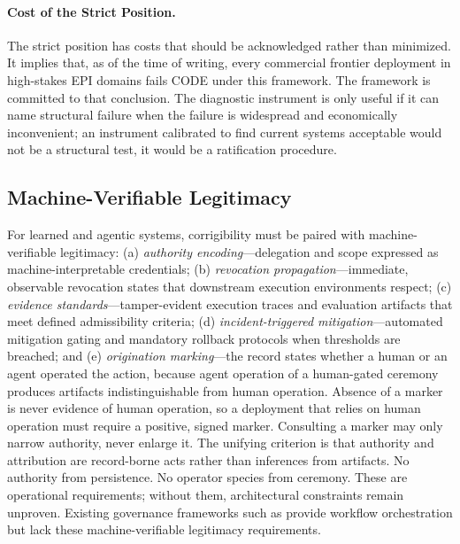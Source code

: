 \documentclass{article}
\theoremstyle{definition}
\begin{document}
\paragraph{Cost of the Strict Position.} The strict position has costs that should be acknowledged rather than minimized. It implies that, as of the time of writing, every commercial frontier deployment in high-stakes EPI domains fails CODE under this framework. The framework is committed to that conclusion. The diagnostic instrument is only useful if it can name structural failure when the failure is widespread and economically inconvenient; an instrument calibrated to find current systems acceptable would not be a structural test, it would be a ratification procedure.

\subsection{Machine-Verifiable Legitimacy}
\label{subsec:machine-verifiable}

For learned and agentic systems, corrigibility must be paired with machine-verifiable legitimacy: (a) \textit{authority encoding}---delegation and scope expressed as machine-interpretable credentials; (b) \textit{revocation propagation}---immediate, observable revocation states that downstream execution environments respect; (c) \textit{evidence standards}---tamper-evident execution traces and evaluation artifacts that meet defined admissibility criteria; (d) \textit{incident-triggered mitigation}---automated mitigation gating and mandatory rollback protocols when thresholds are breached; and (e) \textit{origination marking}---the record states whether a human or an agent operated the action, because agent operation of a human-gated ceremony produces artifacts indistinguishable from human operation. Absence of a marker is never evidence of human operation, so a deployment that relies on human operation must require a positive, signed marker. Consulting a marker may only narrow authority, never enlarge it. The unifying criterion is that authority and attribution are record-borne acts rather than inferences from artifacts. No authority from persistence. No operator species from ceremony. These are operational requirements; without them, architectural constraints remain unproven. Existing governance frameworks such as \citet{abadie2026} provide workflow orchestration but lack these machine-verifiable legitimacy requirements.

\end{document}

